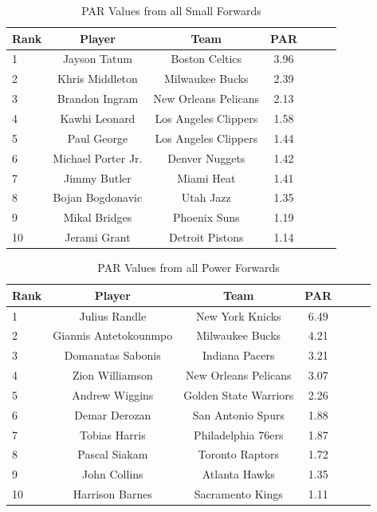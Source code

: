 \documentclass[titlepage, 12pt]{article}
\begin{document}
\begin{table}[tbp]
  \caption{PAR Values from all Small Forwards}
  \label{tab:SFtable}
\centering
\begin{tabular}[t]{lcccccc}
  \toprule
  Rank & Player & Team & PAR\\
  \midrule
 1 & Jayson Tatum & Boston Celtics & 3.96\\
 2 & Khris Middleton & Milwaukee Bucks & 2.39\\
 3 & Brandon Ingram & New Orleans Pelicans & 2.13\\
 4 & Kawhi Leonard & Los Angeles Clippers & 1.58\\
 5 & Paul George & Los Angeles Clippers & 1.44\\
 6 & Michael Porter Jr. & Denver Nuggets & 1.42\\
 7 & Jimmy Butler & Miami Heat & 1.41\\
 8 & Bojan Bogdonavic & Utah Jazz & 1.35\\
 9 & Mikal Bridges & Phoenix Suns & 1.19\\
 10 & Jerami Grant & Detroit Pistons & 1.14\\
  \bottomrule
\end{tabular}
\end{table}

\begin{table}[tbp]
  \caption{PAR Values from all Power Forwards}
  \label{tab:PFtable}
\centering
\begin{tabular}[t]{lcccccc}
  \toprule
  Rank & Player & Team & PAR\\
  \midrule
 1 & Julius Randle & New York Knicks & 6.49\\
 2 & Giannis Antetokounmpo & Milwaukee Bucks & 4.21\\
 3 & Domanatas Sabonis & Indiana Pacers & 3.21\\
 4 & Zion Williamson & New Orleans Pelicans & 3.07\\
 5 & Andrew Wiggins & Golden State Warriors & 2.26\\
 6 & Demar Derozan & San Antonio Spurs & 1.88\\
 7 & Tobias Harris & Philadelphia 76ers & 1.87\\
 8 & Pascal Siakam & Toronto Raptors & 1.72\\
 9 & John Collins & Atlanta Hawks & 1.35\\
 10 & Harrison Barnes & Sacramento Kings & 1.11\\
  \bottomrule
\end{tabular}
\end{table}
\end{document}
